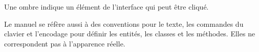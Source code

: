 \begin{itemize}[label=--,itemsep=5pt]
%
%
\end{itemize}
Une ombre indique un élément de l'interface qui peut être cliqué.


Le manuel se réfère aussi à des conventions pour le texte, les commandes du clavier et l'encodage pour définir les entités, les classes et les méthodes. Elles ne correspondent pas à l'apparence réelle.

